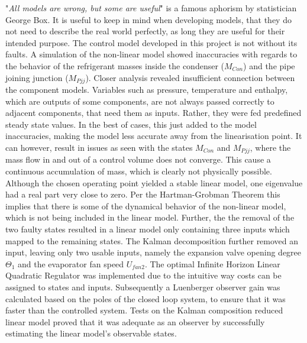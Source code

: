 "\textit{All models are wrong, but some are useful}" is a famous aphorism by statistician George Box. It is useful to keep in mind when developing models, that they do not need to describe the real world perfectly, as long they are useful for their intended purpose. The control model developed in this project is not without its faults. A simulation of the non-linear model showed inaccuracies with regards to the behavior of the refrigerant masses inside the condenser ($M_{Con}$) and the pipe joining junction ($M_{Pjj}$). Closer analysis revealed insufficient connection between the component models. Variables such as pressure, temperature and enthalpy, which are outputs of some components, are not always passed correctly to adjacent components, that need them as inputs. Rather, they were fed predefined steady state values. In the best of cases, this just added to the model inaccuracies, making the model less accurate away from the linearisation point. It can however, result in issues as seen with the states $M_{Con}$ and $M_{Pjj}$, where the mass flow in and out of a control volume does not converge. This cause a continuous accumulation of mass, which is clearly not physically possible. \\

Although the chosen operating point yielded a stable linear model, one eigenvalue had a real part very close to zero. Per the Hartman-Grobman Theorem this implies that there is some of the dynamical behavior of the non-linear model, which is not being included in the linear model. Further, the the removal of the two faulty states resulted in a linear model only containing three inputs which mapped to the remaining states. The Kalman decomposition further removed an input, leaving only two usable inputs, namely the expansion valve opening degree $\Theta_1$ and the evaporator fan speed $U_{fan2}$. The optimal Infinite Horizon Linear Quadratic Regulator was implemented due to the intuitive way costs can be assigned to states and inputs. Subsequently a Luenberger observer gain was calculated based on the poles of the closed loop system, to ensure that it was faster than the controlled system. Tests on the Kalman composition reduced linear model proved that it was adequate as an observer by successfully estimating the linear model's observable states.\\

